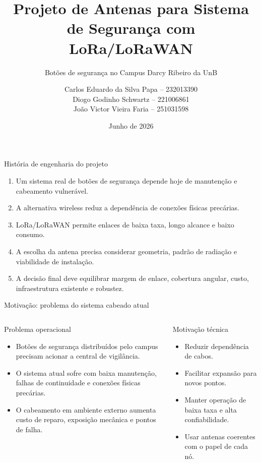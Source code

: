 \documentclass[aspectratio=169]{beamer}
\title[Antenas LoRa/LoRaWAN]{Projeto de Antenas para Sistema de Segurança com LoRa/LoRaWAN}
\subtitle{Botões de segurança no Campus Darcy Ribeiro da UnB}
\author[Carlos Eduardo, Diogo e Jo\~ao Victor]{
  Carlos Eduardo da Silva Papa -- 232013390%
  \texorpdfstring{\\[0.2em]}{, }%
  Diogo Godinho Schwartz -- 221006861%
  \texorpdfstring{\\[0.2em]}{, }%
  Jo\~ao Victor Vieira Faria -- 251031598
}
\institute[UnB]{Universidade de Brasília}
\date{Junho de 2026}
\begin{document}
\begin{frame}
  \titlepage
\end{frame}

\begin{frame}{História de engenharia do projeto}
\small
\begin{enumerate}
  \item Um sistema real de botões de segurança depende hoje de manutenção e cabeamento vulnerável.
  \item A alternativa wireless reduz a dependência de conexões físicas precárias.
  \item LoRa/LoRaWAN permite enlaces de baixa taxa, longo alcance e baixo consumo.
  \item A escolha da antena precisa considerar geometria, padrão de radiação e viabilidade de instalação.
  \item A decisão final deve equilibrar margem de enlace, cobertura angular, custo, infraestrutura existente e robustez.
\end{enumerate}
\end{frame}

\begin{frame}{Motivação: problema do sistema cabeado atual}
\small
\begin{columns}[T,onlytextwidth]
\begin{block}{Problema operacional}
\begin{itemize}
  \item Botões de segurança distribuídos pelo campus precisam acionar a central de vigilância.
  \item O sistema atual sofre com baixa manutenção, falhas de continuidade e conexões físicas precárias.
  \item O cabeamento em ambiente externo aumenta custo de reparo, exposição mecânica e pontos de falha.
\end{itemize}
\end{block}
\begin{block}{Motivação técnica}
\begin{itemize}
  \item Reduzir dependência de cabos.
  \item Facilitar expansão para novos pontos.
  \item Manter operação de baixa taxa e alta confiabilidade.
  \item Usar antenas coerentes com o papel de cada nó.
\end{itemize}
\end{block}
\end{columns}
\end{frame}
\end{document}
